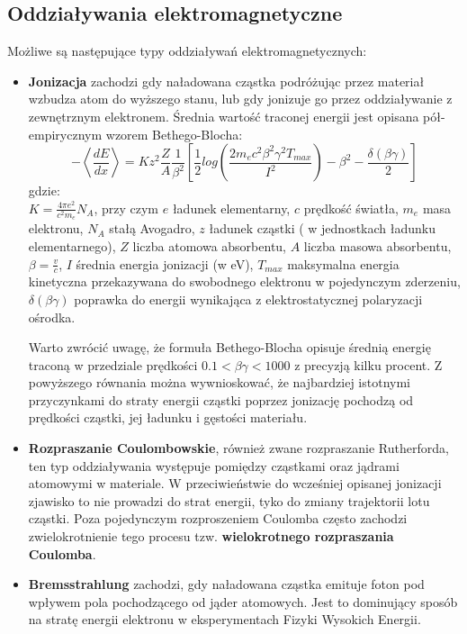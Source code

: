 \subsection{Oddziaływania elektromagnetyczne}
Możliwe są następujące typy oddziaływań elektromagnetycznych:
\begin{itemize}
\item \textbf{Jonizacja} zachodzi gdy naładowana cząstka podróżując przez materiał wzbudza atom do wyższego stanu, lub gdy jonizuje go przez oddziaływanie z zewnętrznym elektronem. Średnia wartość traconej energii jest opisana pół-empirycznym wzorem Bethego-Blocha\cite{Bete}: 
\begin{equation}
-\left< \frac{dE}{dx} \right> = Kz^2\frac{Z}{A}\frac{1}{\beta^2}\left[\frac{1}{2}log\left(\frac{2m_ec^2\beta^2\gamma^2T_{max}}{I^2}\right) -\beta^2-\frac{\delta(\beta\gamma)}{2} \right]
\label{bethe}
\end{equation}
gdzie: \\
$K=\frac{4\pi e^2}{c^2m_e}N_A$, przy czym $e$ ładunek elementarny, $c$ prędkość światła, $m_e$ masa elektronu, $N_A$ stałą Avogadro, $z$ ładunek cząstki ( w jednostkach ładunku elementarnego), $Z$ liczba atomowa absorbentu, $A$ liczba masowa absorbentu, $\beta=\frac{v}{c}$, $I$ średnia energia jonizacji (w eV), $T_{max}$ maksymalna energia kinetyczna przekazywana do swobodnego elektronu w pojedynczym zderzeniu, $\delta(\beta\gamma)$ poprawka do energii wynikająca z elektrostatycznej polaryzacji ośrodka.

Warto zwrócić uwagę, że formuła Bethego-Blocha opisuje średnią energię traconą w przedziale prędkości $0.1<\beta\gamma<1000$ z precyzją kilku procent. Z powyższego równania można wywnioskować, że najbardziej istotnymi przyczynkami do straty energii cząstki poprzez jonizację pochodzą od prędkości cząstki, jej ładunku i gęstości materiału.

\item \textbf{Rozpraszanie Coulombowskie}, również zwane rozpraszanie Rutherforda, ten typ oddziaływania występuje pomiędzy cząstkami oraz jądrami atomowymi w materiale. W przeciwieństwie do wcześniej opisanej jonizacji zjawisko to nie prowadzi do strat energii, tyko do zmiany trajektorii lotu cząstki. Poza pojedynczym rozproszeniem Coulomba często zachodzi zwielokrotnienie tego procesu tzw. \textbf{wielokrotnego rozpraszania Coulomba}.

\item \textbf{Bremsstrahlung} zachodzi, gdy naładowana cząstka emituje foton pod wpływem pola pochodzącego od jąder atomowych. Jest to dominujący sposób na stratę energii elektronu w eksperymentach Fizyki Wysokich Energii.
\end{itemize}
